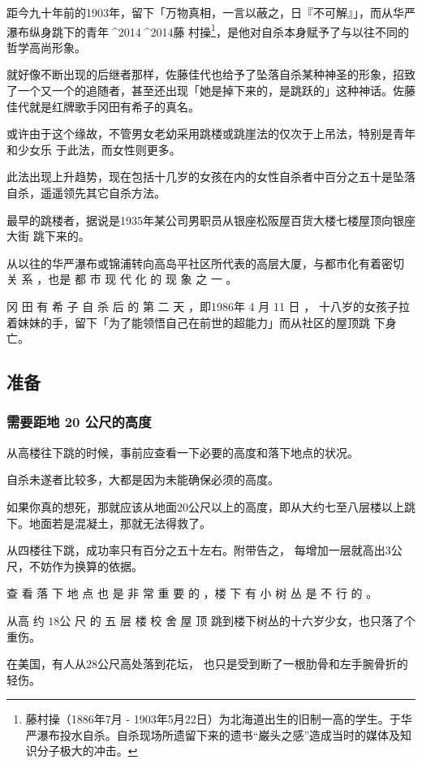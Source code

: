 \documentclass[UTF8]{ctexart}
\begin{document}
距今九十年前的1903年，留下「万物真相，一言以蔽之，日『不可解』」，而从华严瀑布纵身跳下的青年^^^^2014^^^^2014藤
村操\footnote{藤村操（1886年7月 - 1903年5月22日）为北海道出生的旧制一高的学生。于华严瀑布投水自杀。自杀现场所遗留下来的遗书“巌头之感”造成当时的媒体及知识分子极大的冲击。}，是他对自杀本身赋予了与以往不同的哲学高尚形象。

就好像不断出现的后继者那样，佐藤佳代也给予了坠落自杀某种神圣的形象，招致了一个又一个的追随者，甚至还出现「她是掉下来的，是跳跃的」这种神话。佐藤佳代就是红牌歌手冈田有希子的真名。

或许由于这个缘故，不管男女老幼采用跳楼或跳崖法的仅次于上吊法，特别是青年和少女乐 于此法，而女性则更多。

此法出现上升趋势，现在包括十几岁的女孩在内的女性自杀者中百分之五十是坠落自杀，遥遥领先其它自杀方法。

最早的跳楼者，据说是1935年某公司男职员从银座松阪屋百货大楼七楼屋顶向银座大街 跳下来的。

从以往的华严瀑布或锦浦转向高岛平社区所代表的高层大厦，与都市化有着密切 关 系 ，也是 都 市 现 代 化 的 现 象 之 一 。

冈 田 有 希 子 自 杀 后 的 第 二 天 ，即1986年 4 月 11 日 ， 十八岁的女孩子拉着妹妹的手，留下「为了能领悟自己在前世的超能力」而从社区的屋顶跳 下身亡。 

\subsection{准备}

\subsubsection*{需要距地 20 公尺的高度}

从高楼往下跳的时候，事前应查看一下必要的高度和落下地点的状况。

自杀未遂者比较多，大都是因为未能确保必须的高度。

如果你真的想死，那就应该从地面$20$公尺以上的高度，即从大约七至八层楼以上跳下。地面若是混凝土，那就无法得救了。

从四楼往下跳，成功率只有百分之五十左右。附带告之， 每增加一层就高出$3$公尺，不妨作为换算的依据。

查 看 落 下 地 点 也 是 非 常 重 要 的 ，楼 下 有 小 树 丛 是 不 行 的 。

从高 约 $18$公 尺 的 五 层 楼 校 舍 屋 顶 跳到楼下树丛的十六岁少女，也只落了个重伤。

在美国，有人从$28$公尺高处落到花坛， 也只是受到断了一根肋骨和左手腕骨折的轻伤。
\end{document}
